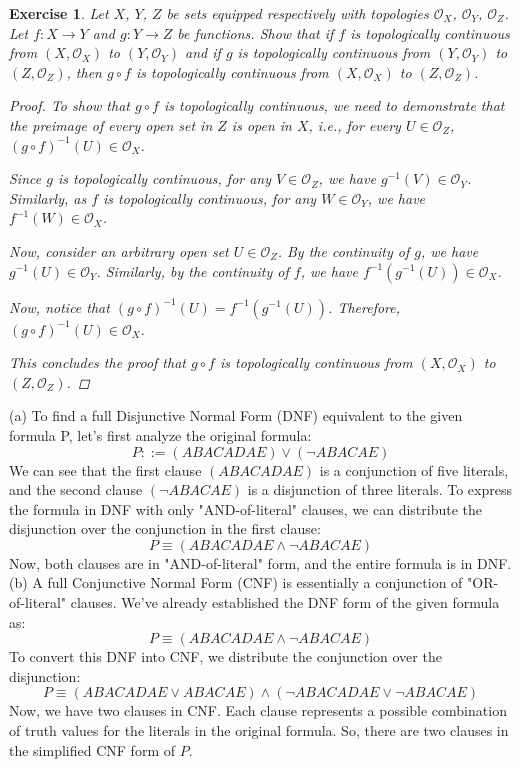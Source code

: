 \documentclass{article}
\newtheorem{exercise}{Exercise}
\begin{document}
    \begin{exercise}
        Let \(X\), \(Y\), \(Z\) be sets equipped respectively with topologies \(\mathcal{O}_X\), \(\mathcal{O}_Y\), \(\mathcal{O}_Z\). Let \(f : X \to Y\) and \(g : Y \to Z\) be functions. Show that if \(f\) is topologically continuous from \((X, \mathcal{O}_X)\) to \((Y, \mathcal{O}_Y)\) and if \(g\) is topologically continuous from \((Y, \mathcal{O}_Y)\) to \((Z, \mathcal{O}_Z)\), then \(g \circ f\) is topologically continuous from \((X, \mathcal{O}_X)\) to \((Z, \mathcal{O}_Z)\).

    \begin{proof}

To show that \(g \circ f\) is topologically continuous, we need to demonstrate that the preimage of every open set in \(Z\) is open in \(X\), i.e., for every \(U \in \mathcal{O}_Z\), \((g \circ f)^{-1}(U) \in \mathcal{O}_X\).

Since \(g\) is topologically continuous, for any \(V \in \mathcal{O}_Z\), we have \(g^{-1}(V) \in \mathcal{O}_Y\). Similarly, as \(f\) is topologically continuous, for any \(W \in \mathcal{O}_Y\), we have \(f^{-1}(W) \in \mathcal{O}_X\).

Now, consider an arbitrary open set \(U \in \mathcal{O}_Z\). By the continuity of \(g\), we have \(g^{-1}(U) \in \mathcal{O}_Y\). Similarly, by the continuity of \(f\), we have \(f^{-1}(g^{-1}(U)) \in \mathcal{O}_X\).

Now, notice that \((g \circ f)^{-1}(U) = f^{-1}(g^{-1}(U))\). Therefore, \((g \circ f)^{-1}(U) \in \mathcal{O}_X\).

This concludes the proof that \(g \circ f\) is topologically continuous from \((X, \mathcal{O}_X)\) to \((Z, \mathcal{O}_Z)\).



   
    

    \end{proof}
    \end{exercise}


    (a) To find a full Disjunctive Normal Form (DNF) equivalent to the given formula P, let's first analyze the original formula:
\[ P ::= (ABACADAE) \lor (\lnot ABACAE) \]
We can see that the first clause \((ABACADAE)\) is a conjunction of five literals, and the second clause \((\lnot ABACAE)\) is a disjunction of three literals. To express the formula in DNF with only "AND-of-literal" clauses, we can distribute the disjunction over the conjunction in the first clause:
\[ P \equiv (ABACADAE \land \lnot ABACAE) \]
Now, both clauses are in "AND-of-literal" form, and the entire formula is in DNF.
(b) A full Conjunctive Normal Form (CNF) is essentially a conjunction of "OR-of-literal" clauses. We've already established the DNF form of the given formula as:
\[ P \equiv (ABACADAE \land \lnot ABACAE) \]
To convert this DNF into CNF, we distribute the conjunction over the disjunction:
\[ P \equiv (ABACADAE \lor ABACAE) \land (\lnot ABACADAE \lor \lnot ABACAE) \]
Now, we have two clauses in CNF. Each clause represents a possible combination of truth values for the literals in the original formula.
So, there are two clauses in the simplified CNF form of \(P\).
\end{document}

